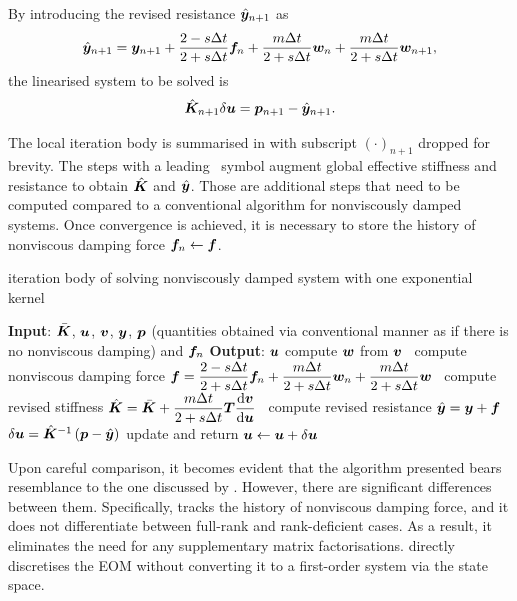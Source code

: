 By introducing the revised resistance $\hat{\bm{y}}_{n+1}$ as
\begin{gather}\label{eq:revised_y}
\hat{\bm{y}}_{n+1}=\bm{y}_{n+1}+\dfrac{2-s\Delta{}t}{2+s\Delta{}t}\bm{f}_n+\dfrac{m\Delta{}t}{2+s\Delta{}t}\bm{w}_n+\dfrac{m\Delta{}t}{2+s\Delta{}t}\bm{w}_{n+1},
\end{gather}
the linearised system to be solved is
\begin{gather}\label{eq:revised_system}
\hat{\bm{K}}_{n+1}\delta\bm{u}=\bm{p}_{n+1}-\hat{\bm{y}}_{n+1}.
\end{gather}

The local iteration body is summarised in  with subscript $\left(\cdot\right)_{n+1}$ dropped for brevity.
The steps with a leading \faMicrochip~symbol augment global effective stiffness and resistance to obtain $\hat{\bm{K}}$ and $\hat{\bm{y}}$. Those are additional steps that need to be computed compared to a conventional algorithm for nonviscously damped systems. Once convergence is achieved, it is necessary to store the history of nonviscous damping force $\bm{f}_n\leftarrow\bm{f}$.
\begin{breakablealgorithm}
\caption{iteration body of solving nonviscously damped system with one exponential kernel}\label{algo:single_model}
\begin{algorithmic}
\State \textbf{Input}: $\bar{\bm{K}}$, $\bm{u}$, $\bm{v}$, $\bm{y}$, $\bm{p}$ (quantities obtained via conventional manner as if there is no nonviscous damping) and $\bm{f}_n$
\State \textbf{Output}: $\bm{u}$
\State compute $\bm{w}$ from $\bm{v}$
\State \faMicrochip~compute nonviscous damping force $\bm{f}=\dfrac{2-s\Delta{}t}{2+s\Delta{}t}\bm{f}_n+\dfrac{m\Delta{}t}{2+s\Delta{}t}\bm{w}_n+\dfrac{m\Delta{}t}{2+s\Delta{}t}\bm{w}$
\State \faMicrochip~compute revised stiffness $\hat{\bm{K}}=\bar{\bm{K}}+\dfrac{m\Delta{}t}{2+s\Delta{}t}\bm{T}\dfrac{\mathrm{d}\bm{v}}{\mathrm{d}\bm{u}}$
\State \faMicrochip~compute revised resistance $\hat{\bm{y}}=\bm{y}+\bm{f}$
\State $\delta\bm{u}=\hat{\bm{K}}^{-1}\left(\bm{p}-\hat{\bm{y}}\right)$
\State update and return $\bm{u}\leftarrow\bm{u}+\delta\bm{u}$
\end{algorithmic}
\end{breakablealgorithm}

Upon careful comparison, it becomes evident that the algorithm presented bears resemblance to the one discussed by \citet{Adhikari2004}. However, there are significant differences between them. Specifically,  tracks the history of nonviscous damping force, and it does not differentiate between full-rank and rank-deficient cases. As a result, it eliminates the need for any supplementary matrix factorisations.  directly discretises the EOM without converting it to a first-order system via the state space.


